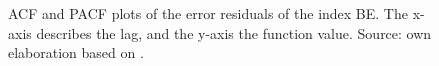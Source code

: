 \documentclass[11pt]{article}
\begin{document}
\begin{figure}[p!]
	\begin{minipage}{.5\linewidth}
		\centering
	\end{minipage}	\begin{minipage}{.5\linewidth}
		\centering
	\end{minipage}
	\caption{ACF and PACF plots of the error residuals of the index BE. The x-axis describes the lag, and the y-axis the function value. Source: own elaboration based on \cite{googleT}.}
	\label{fig:ACFPACFWN_BE}
\end{figure}
\end{document}
